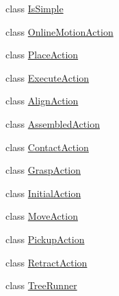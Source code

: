\begin{DoxyCompactItemize}
class \hyperlink{classsarafun_1_1IsSimple}{Is\-Simple}
\item 
class \hyperlink{classsarafun_1_1OnlineMotionAction}{Online\-Motion\-Action}
\item 
class \hyperlink{classsarafun_1_1PlaceAction}{Place\-Action}
\item 
class \hyperlink{classsarafun_1_1ExecuteAction}{Execute\-Action}
\item 
class \hyperlink{classsarafun_1_1AlignAction}{Align\-Action}
\item 
class \hyperlink{classsarafun_1_1AssembledAction}{Assembled\-Action}
\item 
class \hyperlink{classsarafun_1_1ContactAction}{Contact\-Action}
\item 
class \hyperlink{classsarafun_1_1GraspAction}{Grasp\-Action}
\item 
class \hyperlink{classsarafun_1_1InitialAction}{Initial\-Action}
\item 
class \hyperlink{classsarafun_1_1MoveAction}{Move\-Action}
\item 
class \hyperlink{classsarafun_1_1PickupAction}{Pickup\-Action}
\item 
class \hyperlink{classsarafun_1_1RetractAction}{Retract\-Action}
\item 
class \hyperlink{classsarafun_1_1TreeRunner}{Tree\-Runner}
\end{DoxyCompactItemize}
